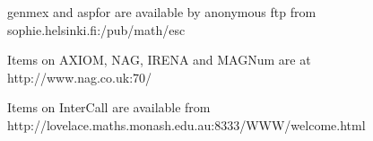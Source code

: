 \par\noindent
genmex and aspfor are available by anonymous ftp from\\
sophie.helsinki.fi:/pub/math/esc

\par\noindent
Items on AXIOM, NAG, IRENA and MAGNum are at\\
http://www.nag.co.uk:70/

\par\noindent
Items on InterCall are available from\\
http://lovelace.maths.monash.edu.au:8333/WWW/welcome.html





